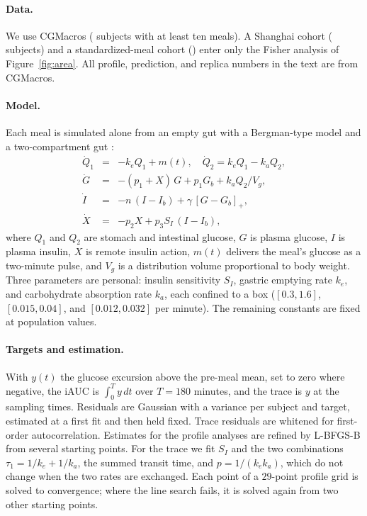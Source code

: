 \documentclass[letterpaper]{article} %
\begin{document}
\paragraph{Data.} We use CGMacros \citep{das2025cgmacros} (\resCohortCgmSubjects{} subjects with at least ten meals). A Shanghai cohort \citep{zhao2023shanghai} (\resCohortShanghaiSubjects{} subjects) and a standardized-meal cohort \citep{hall2018glucotypes} (\resCohortHallSubjects{}) enter only the Fisher analysis of Figure~\ref{fig:area}. All profile, prediction, and replica numbers in the text are from CGMacros.

\paragraph{Model.} Each meal is simulated alone from an empty gut with a Bergman-type model \citep{bergman1979} and a two-compartment gut \citep[for a fuller meal model, see][]{dallaman2007}:
\begin{eqnarray}
\dot Q_1 &=& -k_e Q_1 + m(t),\quad \dot Q_2 = k_e Q_1 - k_a Q_2,\nonumber\\
\dot G &=& -(p_1 + X)\,G + p_1 G_b + k_a Q_2 / V_g,\nonumber\\
\dot I &=& -n\,(I - I_b) + \gamma\,[G - G_b]_+,\nonumber\\
\dot X &=& -p_2 X + p_3 S_I\,(I - I_b),\nonumber
\end{eqnarray}
where $Q_1$ and $Q_2$ are stomach and intestinal glucose, $G$ is plasma glucose, $I$ is plasma insulin, $X$ is remote insulin action, $m(t)$ delivers the meal's glucose as a two-minute pulse, and $V_g$ is a distribution volume proportional to body weight. Three parameters are personal: insulin sensitivity $S_I$, gastric emptying rate $k_e$, and carbohydrate absorption rate $k_a$, each confined to a box ($[0.3,1.6]$, $[0.015,0.04]$, and $[0.012,0.032]$ per minute). The remaining constants are fixed at population values.

\paragraph{Targets and estimation.} With $y(t)$ the glucose excursion above the pre-meal mean, set to zero where negative, the iAUC is $\int_0^T y\,dt$ over $T=180$ minutes, and the trace is $y$ at the sampling times. Residuals are Gaussian with a variance per subject and target, estimated at a first fit and then held fixed. Trace residuals are whitened for first-order autocorrelation. Estimates for the profile analyses are refined by L-BFGS-B from several starting points. For the trace we fit $S_I$ and the two combinations $\tau_1=1/k_e+1/k_a$, the summed transit time, and $p=1/(k_e k_a)$, which do not change when the two rates are exchanged. Each point of a $29$-point profile grid is solved to convergence; where the line search fails, it is solved again from two other starting points.
\end{document}
